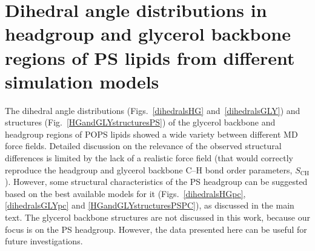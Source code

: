 \documentclass[journal=jpcbfk,manuscript=article]{achemso}
\begin{document}
\pagebreak
\section{Dihedral angle distributions in headgroup and glycerol backbone
  regions of PS lipids from different simulation models}\label{Diheds}

The dihedral angle distributions (Figs.~\ref{dihedralsHG} and~\ref{dihedralsGLY}) and structures (Fig.~\ref{HGandGLYstructuresPS}) of the glycerol backbone and headgroup regions of POPS lipids showed a
wide variety between different MD force fields.
Detailed discussion on the relevance of the observed structural differences is limited by the lack of a realistic force field (that would correctly reproduce the
headgroup and glycerol backbone C--H bond order parameters, $S_\mathrm{CH}$). However, some structural characteristics
of the PS headgroup can be suggested based on the best available models for it
(Figs.~\ref{dihedralsHGpc}, \ref{dihedralsGLYpc} and \ref{HGandGLYstructuresPSPC}), as discussed in the main text.
The glycerol backbone structures are not discussed in this work, because our focus is on the PS headgroup.
However, the data presented here can be useful for future investigations.
\end{document}
